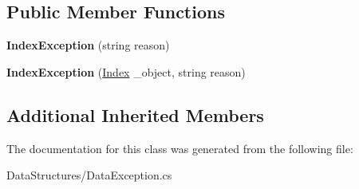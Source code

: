 \subsection*{Public Member Functions}
\begin{DoxyCompactItemize}
\item 
\hypertarget{class_dwarf_d_b_1_1_data_structures_1_1_index_exception_aee03e81543a53f20ddcca303c79018ad}{{\bfseries Index\+Exception} (string reason)}\label{class_dwarf_d_b_1_1_data_structures_1_1_index_exception_aee03e81543a53f20ddcca303c79018ad}

\item 
\hypertarget{class_dwarf_d_b_1_1_data_structures_1_1_index_exception_a2c9bcab774735ac2406f852f55647d46}{{\bfseries Index\+Exception} (\hyperlink{class_dwarf_d_b_1_1_data_structures_1_1_index}{Index} \+\_\+object, string reason)}\label{class_dwarf_d_b_1_1_data_structures_1_1_index_exception_a2c9bcab774735ac2406f852f55647d46}

\end{DoxyCompactItemize}
\subsection*{Additional Inherited Members}


The documentation for this class was generated from the following file\+:\begin{DoxyCompactItemize}
\item 
Data\+Structures/Data\+Exception.\+cs\end{DoxyCompactItemize}
